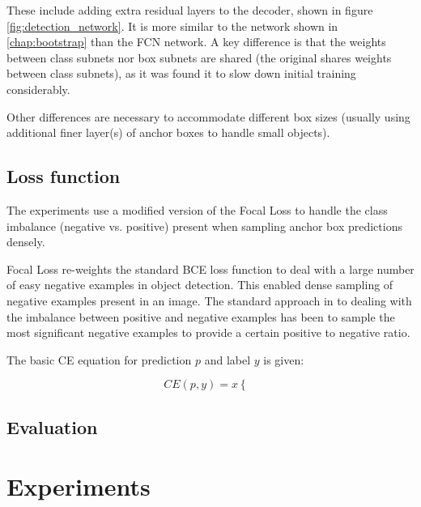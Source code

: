 These include adding extra residual layers to the decoder, shown in figure \ref{fig:detection_network}. It is more similar to the network shown in  \ref{chap:bootstrap} than the \gls{FCN} network. A key difference is that the weights between class subnets nor box subnets are shared (the original shares weights between class subnets), as it was found it to slow down initial training considerably. 


Other differences are necessary to accommodate different box sizes (usually using additional finer layer(s) of anchor boxes to handle small objects).

\subsection {Loss function}
\label{sec:loss}


The experiments use a modified version of the Focal Loss \cite{Lin2017} to handle the class imbalance (negative vs. positive) present when sampling anchor box predictions densely.

Focal Loss \cite{Lin2017} re-weights the standard \gls{BCE} loss function to deal with a large number of easy negative examples in object detection. This enabled dense sampling of negative examples present in an image. The standard approach in to dealing with the imbalance between positive and negative examples has been to sample the most significant negative examples to provide a certain positive to negative ratio.

The basic \gls{CE} equation for prediction $p$ and label $y$ is given:

\begin{equation}
CE(p, y) = x
  \begin{cases}
  \end{cases}
\label{eq:cross_entropy}
\end{equation}



\subsection {Evaluation}
\label{sec:evaluation}



\section{Experiments}
\label{sec:detection_experiments}



